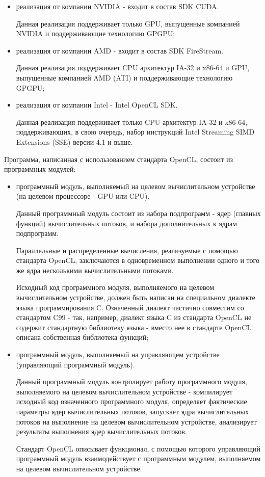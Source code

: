 \begin{itemize}

	\item реализация от компании NVIDIA - входит в состав SDK CUDA.

		Данная реализация поддерживает только GPU, выпущенные компанией NVIDIA и поддерживающие технологию GPGPU;

	\item реализация от компании AMD - входит в состав SDK FireStream.

		Данная реализация поддерживает CPU архитектур IA-32 и x86-64 и GPU, выпущенные компанией AMD (ATI) и поддерживающие технологию GPGPU;

	\item реализация от компании Intel - Intel OpenCL SDK.

		Данная реализация поддерживает только CPU архитектур IA-32 и x86-64, поддерживающих, в свою очередь, набор инструкций Intel Streaming SIMD Extensions (SSE) версии 4.1 и выше.

\end{itemize}

Программа, написанная с использованием стандарта OpenCL, состоит из программных модулей:

\begin{itemize}

	\item программный модуль, выполняемый на целевом вычислительном устройстве (на целевом процессоре - GPU или CPU).
	
		Данный программный модуль состоит из набора подпрограмм - ядер (главных функций) вычислительных потоков, и набора дополнительных к ядрам подпрограмм.

		Параллельные и распределенные вычисления, реализуемые с помощью стандарта OpenCL, заключаются в одновременном выполнении одного и того же ядра несколькими вычислительными потоками.

		Исходный код программного модуля, выполняемого на целевом вычислительном устройстве, должен быть написан на специальном диалекте языка программирования C. Означенный диалект частично совместим со стандартом C99 - так, например, диалект языка C из стандарта OpenCL не содержит стандартную библиотеку языка - вместо нее в стандарте OpenCL описана собственная библиотека функций;

	\item программный модуль, выполняемый на управляющем устройстве (управляющий программный модуль).

		Данный программный модуль контролирует работу программного модуля, выполняемого на целевом вычислительном устройстве - компилирует исходный код означенного программного модуля, определяет фактические параметры ядер вычислительных потоков, запускает ядра вычислительных потоков на выполнение на целевом вычислительном устройстве, анализирует результаты выполнения ядер вычислительных потоков.

		Стандарт OpenCL описывает функционал, с помощью которого управляющий программный модуль взаимодействует с программным модулем, выполняемом на целевом вычислительном устройстве.

\end{itemize}

